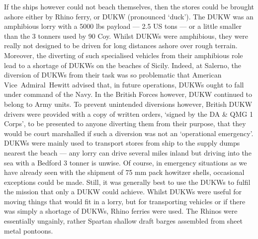\documentclass[noraggedright]{turabian-researchpaper}
\begin{document}
If the ships however could not beach themselves, then the stores could be 
brought ashore either by Rhino ferry, or DUKW (pronounced `duck').  The DUKW 
was an amphibious lorry with a 5000 lbs payload --- 2.5 US tons --- or a 
little smaller than the 3 tonners used by 90 Coy.  Whilst DUKWs were 
amphibious, they were really not designed to be driven for long distances 
ashore over rough terrain.  Moreover, the diverting of such specialised 
vehicles from their amphibious role lead to a shortage of DUKWs on the 
beaches of Sicily.\autocite[87-9]{wos} %
Indeed, at Salerno, the diversion of DUKWs from their task was so problematic 
that American \mbox{Vice Admiral Hewitt} advised that, in future operations, 
DUKWs ought to fall under command of the Navy.\autocite[108]{wos} In the 
British Forces however, DUKW continued to belong to Army units.  To prevent 
unintended diversions however, British DUKW drivers were provided with a copy 
of written orders, `signed by the DA \& QMG 1 Corps', to be presented to 
anyone diverting them from their purpose, that they would be court marshalled 
if such a diversion was not an `operational emergency'.\autocites
	[
		27 Armd. Bde Maintenance Project - 
		2nd Edition (Appendix to May 1944)
	]
	[
		Section 14 para 3
	]{27wd}
	[
		Quotes from 3 Br Inf Div Adm Plan - 
		Second Edition (Appendix to May 1944)
	]
	[
		Section 12 Para 8
	]{3aqwd} %
DUKWs were mainly used to transport stores from ship to the supply dumps 
nearest the beach --- any lorry can drive several miles inland but driving 
into the sea with a Bedford 3 tonner is unwise.  Of course, in emergency 
situations as we have already seen with the shipment of 75 mm pack howitzer 
shells, occasional exceptions could be made.  Still, it was generally best to 
use the DUKWs to fulfil the mission that only a DUKW could achieve.  Whilst
DUKWs were useful for moving things that would fit in a lorry, but for 
transporting vehicles or if there was simply a shortage of DUKWs, Rhino 
ferries were used.  The Rhinos were essentially ungainly, rather Spartan 
shallow draft barges assembled from sheet metal pontoons. %
\end{document}
